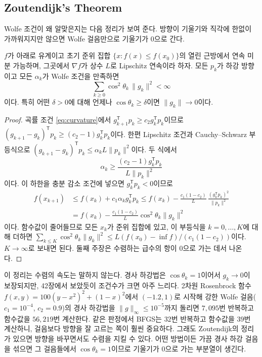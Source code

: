 \subsection{Zoutendijk's Theorem}

Wolfe 조건이 왜 알맞은지는 다음 정리가 보여 준다. 방향이 기울기와 직각에 한없이 가까워지지만 않으면 Wolfe 걸음만으로 기울기가 $0$으로 간다.

\begin{theorem}[Zoutendijk]
\label{thm:zoutendijk}
$f$가 아래로 유계이고 초기 준위 집합 $\{x:f(x)\le f(x_0)\}$의 열린 근방에서 연속 미분 가능하며, 그곳에서 $\nabla f$가 상수 $L$로 Lipschitz 연속이라 하자. 모든 $p_k$가 하강 방향이고 모든 $\alpha_k$가 Wolfe 조건을 만족하면
\[
\sum_{k\ge0}\cos^2\theta_k\,\|g_k\|^2<\infty
\]
이다. 특히 어떤 $\delta>0$에 대해 언제나 $\cos\theta_k\ge\delta$이면 $\|g_k\|\to0$이다.
\end{theorem}

\begin{proof}
곡률 조건 \eqref{eq:curvature}에서 $g_{k+1}^{\mathsf T}p_k\ge c_2g_k^{\mathsf T}p_k$이므로 $(g_{k+1}-g_k)^{\mathsf T}p_k\ge(c_2-1)g_k^{\mathsf T}p_k$이다. 한편 Lipschitz 조건과 Cauchy--Schwarz 부등식으로 $(g_{k+1}-g_k)^{\mathsf T}p_k\le\alpha_kL\|p_k\|^2$이다. 두 식에서
\[
\alpha_k\ge\frac{(c_2-1)g_k^{\mathsf T}p_k}{L\|p_k\|^2}
\]
이다. 이 하한을 충분 감소 조건에 넣으면 $g_k^{\mathsf T}p_k<0$이므로
\begin{align*}
f(x_{k+1})&\le f(x_k)+c_1\alpha_kg_k^{\mathsf T}p_k\le f(x_k)-\frac{c_1(1-c_2)}L\,\frac{(g_k^{\mathsf T}p_k)^2}{\|p_k\|^2}\\
&=f(x_k)-\frac{c_1(1-c_2)}L\cos^2\theta_k\|g_k\|^2
\end{align*}
이다. 함수값이 줄어들므로 모든 $x_k$가 준위 집합에 있고, 이 부등식을 $k=0,\dots,K$에 대해 더하면 $\sum_{k\le K}\cos^2\theta_k\|g_k\|^2\le L(f(x_0)-\inf f)/(c_1(1-c_2))$이다. $K\to\infty$로 보내면 된다. 둘째 주장은 수렴하는 급수의 항이 $0$으로 가는 데서 나온다.
\end{proof}

이 정리는 수렴의 속도는 말하지 않는다. 경사 하강법은 $\cos\theta_k=1$이어서 $g_k\to0$이 보장되지만, 42장에서 보았듯이 조건수가 크면 아주 느리다. 2차원 Rosenbrock 함수 $f(x,y)=100(y-x^2)^2+(1-x)^2$에서 $(-1.2,1)$로 시작해 강한 Wolfe 걸음($c_1=10^{-4}$, $c_2=0.9$)의 경사 하강법을 $\|g\|_\infty\le10^{-5}$까지 돌리면 $7{,}095$번 반복하고 함수값을 $56{,}219$번 계산한다. 같은 판정에서 BFGS는 $32$번 반복하고 함수값을 $39$번 계산하니, 걸음보다 방향을 잘 고르는 쪽이 훨씬 중요하다. 그래도 Zoutendijk의 정리\cite{nocedal2006}가 있으면 방향을 바꾸면서도 수렴을 지킬 수 있다. 어떤 방법이든 가끔 경사 하강 걸음을 섞으면 그 걸음들에서 $\cos\theta_k=1$이므로 기울기가 $0$으로 가는 부분열이 생긴다.

